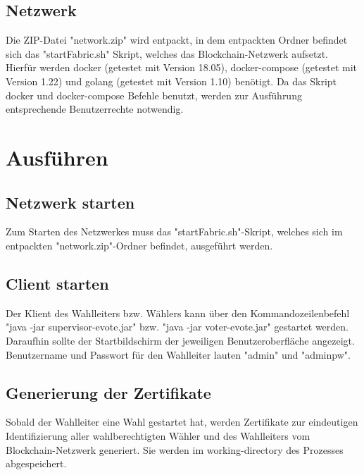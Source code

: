 \documentclass[parskip=full]{scrartcl}
\begin{document}
	\subsection{Netzwerk}
	Die ZIP-Datei "network.zip" wird entpackt, in dem entpackten Ordner befindet sich das "startFabric.sh" Skript, welches das Blockchain-Netzwerk aufsetzt. Hierfür werden docker (getestet mit Version 18.05), docker-compose (getestet mit Version 1.22) und golang (getestet mit Version 1.10) benötigt.
	Da das Skript docker und docker-compose Befehle benutzt, werden zur Ausführung entsprechende Benutzerrechte notwendig.
	
	\section{Ausführen}
	\subsection{Netzwerk starten}
	Zum Starten des Netzwerkes muss das "startFabric.sh"-Skript, welches sich im entpackten "network.zip"-Ordner befindet, ausgeführt werden.
	
	\subsection{Client starten}
	Der Klient des Wahlleiters bzw. Wählers kann über den Kommandozeilenbefehl "java -jar supervisor-evote.jar" bzw. "java -jar voter-evote.jar" gestartet werden. Daraufhin sollte der Startbildschirm der jeweiligen Benutzeroberfläche angezeigt. Benutzername und Passwort für den Wahlleiter lauten "admin" und "adminpw".
	
	\subsection{Generierung der Zertifikate}
	Sobald der Wahlleiter eine Wahl gestartet hat, werden Zertifikate zur eindeutigen Identifizierung aller wahlberechtigten Wähler und des Wahlleiters vom Blockchain-Netzwerk generiert. Sie werden im working-directory des Prozesses abgespeichert. 
		
\end{document}
